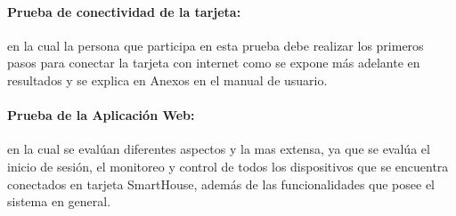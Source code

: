 \paragraph{Prueba de conectividad de la tarjeta:} en la cual la persona que participa en esta prueba debe realizar los primeros pasos para conectar la tarjeta con internet como se expone más adelante en resultados y se explica en Anexos en el manual de usuario.\\

\paragraph{Prueba de la Aplicación Web:} en la cual se evalúan diferentes aspectos y la mas extensa, ya que se evalúa el inicio de sesión, el monitoreo y control de todos los dispositivos que se encuentra conectados en tarjeta SmartHouse, además de las funcionalidades que posee el sistema en general.